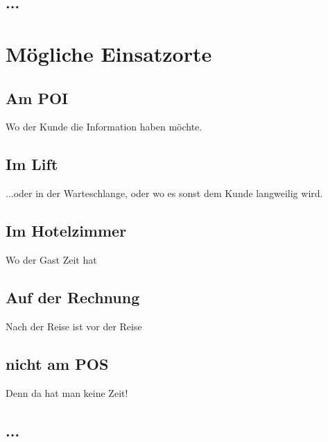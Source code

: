 \subsection{...}

\section{Mögliche Einsatzorte}

\subsection{Am POI}
Wo der Kunde die Information haben möchte.

\subsection{Im Lift}
...oder in der Warteschlange, oder wo es sonst dem Kunde langweilig wird.

\subsection{Im Hotelzimmer}
Wo der Gast Zeit hat

\subsection{Auf der Rechnung}
Nach der Reise ist vor der Reise

\subsection{nicht am POS}
Denn da hat man keine Zeit!

\subsection{...}

